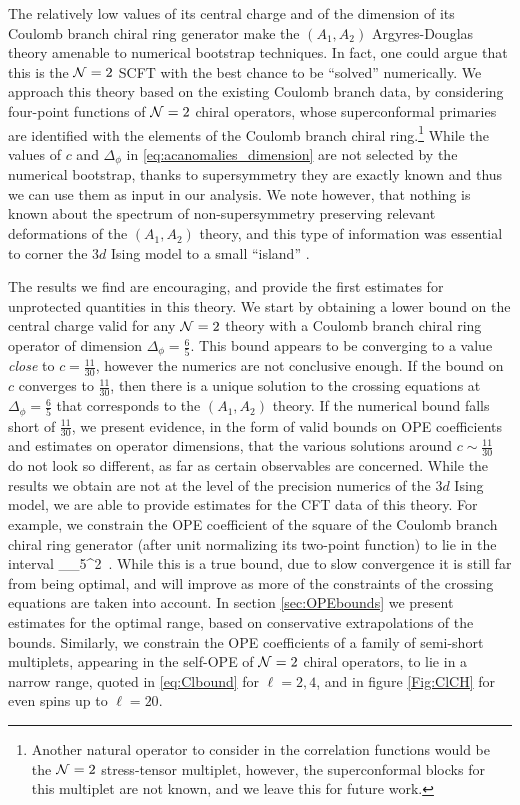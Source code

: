 The relatively low values of its central charge and of the dimension of its Coulomb branch chiral ring generator make the $(A_1,A_2)$ Argyres-Douglas theory amenable to numerical bootstrap techniques. 
In fact, one could argue that this is the ${\mathcal{N}}=2$ SCFT with the best chance to be ``solved'' numerically.
We approach this theory based on the existing Coulomb branch data, by considering four-point functions of ${\mathcal{N}}=2$ chiral operators, whose superconformal primaries are identified with the elements of the Coulomb branch chiral ring.\footnote{Another natural operator to consider in the correlation functions would be the ${\mathcal{N}}=2$ stress-tensor multiplet, however, the superconformal blocks for this multiplet are not known, and we leave this for future work.}
While the values of $c$ and $\Delta_\phi$ in \eqref{eq:acanomalies_dimension} are not selected by the numerical bootstrap, thanks to supersymmetry they are exactly known and thus we can use them as input in our analysis.
We note however, that nothing is known about the spectrum of 
non-supersymmetry preserving
relevant deformations of the $(A_1,A_2)$ theory, and this type of information was essential to corner the $3d$ Ising model to a small ``island'' \cite{Kos:2014bka}. 

\bigskip

The results we find are encouraging, and provide the first estimates for unprotected quantities in this theory.
We start by obtaining a lower bound on the central charge valid for any ${\mathcal{N}}=2$ theory with a Coulomb branch chiral ring operator of dimension $\Delta_{\phi} = \frac65$. This bound appears to be converging to a value \emph{close} to $c=\tfrac{11}{30}$, however the numerics are not conclusive enough. If the bound on $c$ converges to $\tfrac{11}{30}$, then there is a unique solution to the crossing equations at $\Delta_{\phi} = \frac65$ that corresponds to the $(A_1,A_2)$ theory.
If the numerical bound falls short of $\tfrac{11}{30}$, we present evidence, in the form of valid bounds on OPE coefficients and estimates on operator dimensions, that the various solutions around $c \sim \tfrac{11}{30}$ do not look so different, as far as certain observables are concerned. 
While the results we obtain are not at the level of the precision numerics of the $3d$ Ising model, 
we are able to provide estimates for the CFT data of this theory.
For example, we constrain the OPE coefficient of 
the square of the Coulomb branch chiral ring generator (after unit normalizing its two-point function) to lie in the interval
 \leqslant \lambda_{\EE_{5}}^2  \,.
\label{eq:Ebound_intro}
\ee
While this is a true bound, due to slow convergence it is still far from being optimal, and will improve as more of the constraints of the crossing equations are taken into account. In section \ref{sec:OPEbounds} we present estimates for the optimal range, based on conservative extrapolations of the bounds.
Similarly, we constrain the OPE coefficients of a family of semi-short multiplets,
 appearing in the self-OPE of ${\mathcal{N}}=2$ chiral operators, to lie in a narrow range, quoted in \eqref{eq:Clbound} for $\ell=2,4$, and in figure \ref{Fig:ClCH} for even spins up to $\ell=20$.


